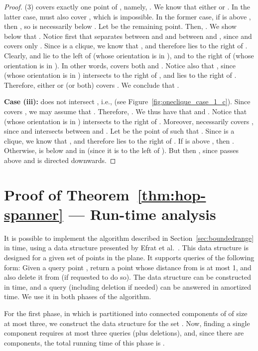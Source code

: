 \documentclass[11pt]{article}
\begin{document}
{\begin{proof}
(3)  covers exactly one point of , namely, . We know that either  or . In the latter case,  must also cover , which is impossible. In the former case, if  is above , then , so  is necessarily below .
Let  be the remaining point. Then, . We show below that . 
Notice first that  separates between  and  and between  and , since  and  covers only . Since  is a clique, we know that , and therefore  lies to the right of . Clearly,  and  lie to the left of  (whose orientation is in ), and to the right of  (whose orientation is in ). In other words,  covers both  and . Notice also that , since  (whose orientation is in ) intersects  to the right of , and  lies to the right of . Therefore, either  or  (or both) covers . We conclude that .  
 

{\bf Case (iii):}  does not intersect , i.e.,  (see Figure~\ref{fig:oneclique_case_1_c}). Since  covers , we may assume that . Therefore, . We thus have that  and . Notice that  (whose orientation is in )
intersects  to the right of . Moreover,  necessarily covers , since  and  intersects  between  and . Let  be the point of  such that .
Since  is a clique, we know that , and therefore  lies to the right of . If  is above , then . Otherwise,  is below  and in  (since it is to the left of ). But then , since  passes above  and  is directed downwards.
\end{proof}


\vspace{-7mm}
\section{Proof of Theorem~\ref{thm:hop-spanner} --- Run-time analysis}

It is possible to implement the algorithm described in Section~\ref{sec:boundedrange} in  time, using a data structure presented by Efrat et al.~\cite{EIK01}. This data structure is designed for a given set  of  points in the plane. It supports queries of the following form: Given a query point , return a point  whose distance from  is at most 1, and also delete it from  (if requested to do so). The data structure can be constructed in  time, and a query (including deletion if needed) can be answered in amortized  time. We use it in both phases of the algorithm.

For the first phase, in which  is partitioned into connected components of  of size at most three, we construct the data structure for the set . Now, finding a single component requires at most three queries (plus deletions), and, since there are  components, the total running time of this phase is .

}
\end{document}
